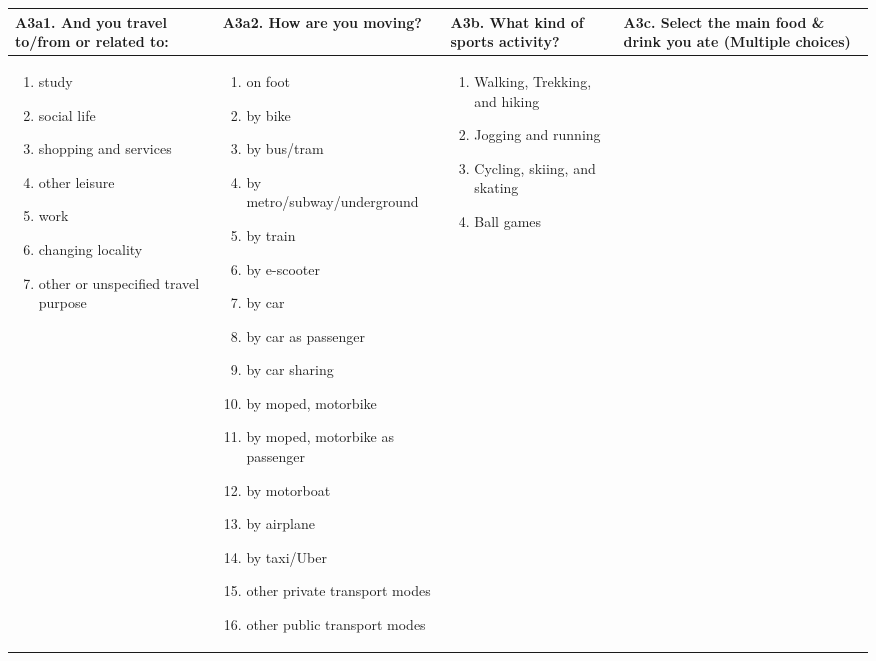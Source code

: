 \begin{tabularx}{0.97\textwidth}{XXXX}
    \toprule
    \textbf{A3a1. And you travel to/from or related to:}&
    \textbf{A3a2. How are you moving?}&
    \textbf{A3b. What kind of sports activity?}&
    \textbf{A3c. Select the main food \& drink you ate} (Multiple choices)\\
    \midrule
    \begin{enumerate}[leftmargin=*]
        \item study
        \item social life
        \item shopping and services
        \item other leisure
        \item work
        \item changing locality
        \item other or unspecified travel purpose
    \end{enumerate}&
    \begin{enumerate}[leftmargin=*]
        \item on foot
        \item by bike
        \item by bus/tram
        \item by metro/subway/underground
        \item by train
        \item by e-scooter
        \item by car
        \item by car as passenger
        \item by car sharing
        \item by moped, motorbike
        \item by moped, motorbike as passenger
        \item by motorboat
        \item by airplane
        \item by taxi/Uber
        \item other private transport modes
        \item other public transport modes
    \end{enumerate}&
    \begin{enumerate}[leftmargin=*]
        \item Walking, Trekking, and hiking
        \item Jogging and running
        \item Cycling, skiing, and skating
        \item Ball games

\end{enumerate}
\end{tabularx}
